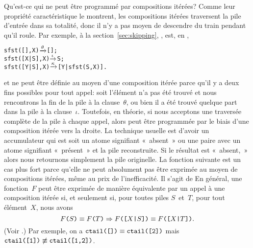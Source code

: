 Qu'est-ce qui ne peut être programmé par compositions itérées? Com\-me
leur propriété caractéristique le montrent, les compositions itérées
traversent la pile d'entrée dans sa totalité, donc il n'y a pas moyen
de descendre du train pendant qu'il roule. Par exemple,  à
la section~\ref{sec:skipping}, , est, en
\Erlang,
\begin{alltt}
sfst(   [],X) \(\smashedrightarrow{\theta}\) [];
sfst([X|S],X) \(\smashedrightarrow{\iota}\) S;
sfst([Y|S],X) \(\smashedrightarrow{\kappa}\) [Y|sfst(S,X)].
\end{alltt}
et ne peut être définie au moyen d'une composition itérée parce qu'il
y a deux fins possibles pour tout appel: soit l'élément n'a pas été
trouvé et nous rencontrons la fin de la pile à la clause~\(\theta\),
ou bien il a été trouvé quelque part dans la pile à la
clause~\(\iota\). Toutefois, en théorie, si nous acceptons une
traversée complète de la pile à chaque appel, alors 
peut être programmée par le biais d'une composition itérée vers la
droite. La technique usuelle est d'avoir un accumulateur qui est soit
un atome signifiant «~absent~» ou une paire avec un atome signifiant
«~présent~» et la pile reconstruite. Si le résultat est «~absent,~» alors
nous retournons simplement la pile originelle. La fonction suivante
est un cas plus fort parce qu'elle ne peut absolument pas être
exprimée au moyen de compositions itérées, même au prix de
l'inefficacité. Il s'agit de
\label{code_ctail}  En général, une
fonction~\(F\) peut être exprimée de manière équivalente par un appel
à une composition itérée si, et seulement si, pour toutes piles
\(S\)~et~\(T\), pour tout élément~\(X\), nous avons
\begin{equation*}
\texttt{\(F\)(\(S\))} \equiv \texttt{\(F\)(\(T\))}
\Rightarrow
\texttt{\(F\)([\(X\)|\(S\)])}
\equiv
\texttt{\(F\)([\(X\)|\(T\)])}.
\end{equation*}
(Voir \cite{GibbonsHuttonAltenkirch_2001,WeberCaldwell_2004}.) Par
exemple, on a \(\texttt{ctail([])} \equiv \texttt{ctail([2])}\) mais
\(\texttt{ctail([1])} \mathrel{\not\equiv} \texttt{ctail([1,2])}\).

